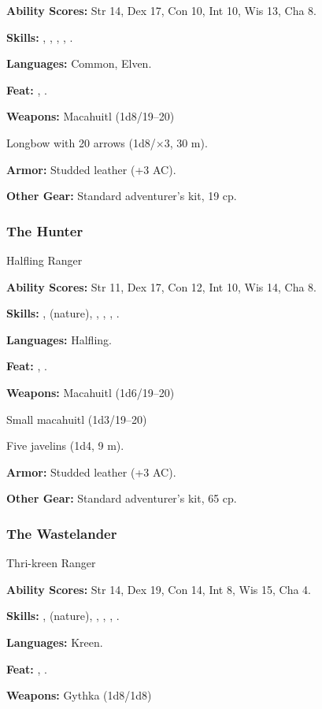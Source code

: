 \textbf{Ability Scores:} Str 14, Dex 17, Con 10, Int 10, Wis 13, Cha 8.

\textbf{Skills:} , , , , .

\textbf{Languages:} Common, Elven.

\textbf{Feat:} , .

\textbf{Weapons:} Macahuitl (1d8/19--20)

Longbow with 20 arrows (1d8/$\times$3, 30 m).

\textbf{Armor:} Studded leather (+3 AC).

\textbf{Other Gear:} Standard adventurer's kit, 19 cp.

\subsubsection{The Hunter}
Halfling Ranger

\textbf{Ability Scores:} Str 11, Dex 17, Con 12, Int 10, Wis 14, Cha 8.

\textbf{Skills:} ,  (nature), , , , .

\textbf{Languages:} Halfling.

\textbf{Feat:} , .

\textbf{Weapons:} Macahuitl (1d6/19--20)

Small macahuitl (1d3/19--20)

Five javelins (1d4, 9 m).

\textbf{Armor:} Studded leather (+3 AC).

\textbf{Other Gear:} Standard adventurer's kit, 65 cp.

\subsubsection{The Wastelander}
Thri-kreen Ranger

\textbf{Ability Scores:} Str 14, Dex 19, Con 14, Int 8, Wis 15, Cha 4.

\textbf{Skills:} ,  (nature), , , , .

\textbf{Languages:} Kreen.

\textbf{Feat:} , .

\textbf{Weapons:} Gythka (1d8/1d8)

